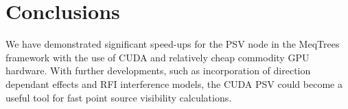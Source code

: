 \section{Conclusions}

We have demonstrated significant speed-ups for the PSV node in the MeqTrees
framework with the use of  CUDA and relatively cheap commodity GPU hardware.
With further developments, such as  incorporation of direction dependant
effects and RFI interference models, the CUDA PSV could become a useful tool
for fast point source visibility calculations.



